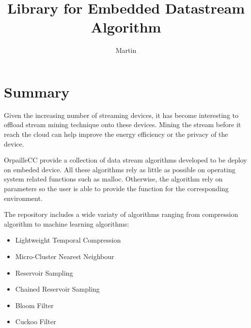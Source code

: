 \documentclass{article}
\title{Library for Embedded Datastream Algorithm}
\author{Martin}
\begin{document}
\maketitle
\section{Summary}
Given the increasing number of streaming devices, it has become interesting to
offload stream mining technique onto these devices. Mining the stream before it
reach the cloud can help improve the energy efficiency or the privacy of the
device.

OrpailleCC provide a collection of data stream algorithms developed to be
deploy on embeded device.  All these algorithms rely as little as possible on
operating system related functions such as malloc.  Otherwise, the algorithm
rely on parameters so the user is able to provide the function for the
corresponding environment.

The repository includes a wide variaty of algorithms ranging from compression
algorithm to machine learning algorithms:
\begin{itemize}
	\item Lightweight Temporal Compression \cite{ltc}
	\item Micro-Cluster Nearest Neighbour \cite{mc-nn}
	\item Reservoir Sampling \cite{reservoir_sampling}
	\item Chained Reservoir Sampling \cite{chained_reservoir_sampling}
	\item Bloom Filter \cite{bloom}
	\item Cuckoo Filter \cite{cuckoo_filter}
\end{itemize}

\end{document}
